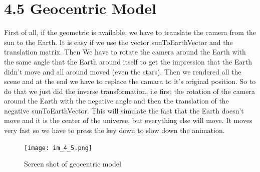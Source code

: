\documentclass[10pt,a4paper]{report}
\begin{document}
\newpage

\section*{4.5   Geocentric Model}

First of all, if the geometric is available, we have to translate the camera from the sun to the Earth. It is easy if we use the vector sunToEarthVector and the translation matrix. Then We have to rotate the camera around the Earth with the same angle that the Earth around itself to get the impression that the Earth didn't move and all around moved (even the stars). Then we rendered all the scene and at the end we have to replace the camara to it's original position. So to do that we just did the inverse transformation, i.e first the rotation of the camera around the Earth with the negative angle and then the translation of the negative sunToEarthVector. This will simulate the fact that the Earth doesn't move and it is the center of the universe, but everything else will move. It moves very fast so we have to press the key down to slow down the animation.
\begin{figure}[h!]
\caption{Screen shot of geocentric model}
  \centering
    \texttt{[image: im\_4\_5.png]}
\end{figure}
\end{document}
